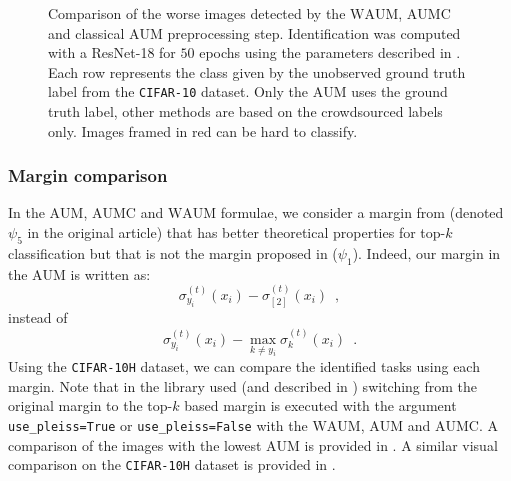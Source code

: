 \begin{figure}[th]
    \caption{Comparison of the worse images detected by the $\mathrm{WAUM}$, $\mathrm{AUMC}$ and classical $\mathrm{AUM}$ preprocessing step. Identification was computed with a ResNet-18 for $50$ epochs using the parameters described in . Each row represents the class given by the unobserved ground truth label from the \texttt{CIFAR-10} dataset. Only the $\mathrm{AUM}$ uses the ground truth label, other methods are based on the crowdsourced labels only. Images framed in red can be hard to classify.}
    \label{fig:comparison_waums_aumc}
\end{figure}


\subsubsection{Margin comparison}
\label{sec:margin_comparison}

In the $\mathrm{AUM}$, $\mathrm{AUMC}$ and $\mathrm{WAUM}$ formulae, we consider a margin from \citet{yang2020consistency} (denoted $\psi_5$ in the original article) that has better theoretical properties for top-$k$ classification but that is not the margin proposed in \citet{pleiss_identifying_2020} ($\psi_1$).
Indeed, our margin in the $\mathrm{AUM}$ is written as:
$$
\sigma_{y_i}^{(t)}(x_i) - \sigma_{[2]}^{(t)}(x_i) \enspace,
$$
instead of
$$
\sigma_{y_i}^{(t)}(x_i) - \max_{k\neq y_i}\sigma_{k}^{(t)}(x_i) \enspace.
$$
Using the \texttt{CIFAR-10H} dataset, we can compare the identified tasks using each margin.
Note that in the library used (and described in ) switching from the original margin to the top-$k$ based margin is executed with the argument \texttt{use\_pleiss=True} or \texttt{use\_pleiss=False} with the $\mathrm{WAUM}$, $\mathrm{AUM}$ and $\mathrm{AUMC}$. A comparison of the images with the lowest $\mathrm{AUM}$ is provided in . A similar visual comparison on the \texttt{CIFAR-10H} dataset is provided in .

